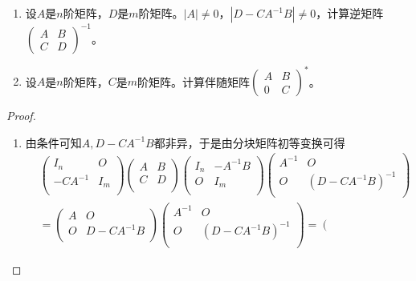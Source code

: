 \documentclass[../../main.tex]{subfiles}
\begin{document}
\begin{example}
\begin{enumerate}
\item 设\(A\)是\(n\)阶矩阵，\(D\)是\(m\)阶矩阵。\(|A|\neq0\)，\(|D - CA^{-1}B|\neq0\)，计算逆矩阵\(\begin{pmatrix}A & B \\ C & D\end{pmatrix}^{-1}\)。

\item 设\(A\)是\(n\)阶矩阵，\(C\)是\(m\)阶矩阵。计算伴随矩阵\(\begin{pmatrix}A & B \\ 0 & C\end{pmatrix}^*\)。 
\end{enumerate}
\end{example}
\begin{proof}
\begin{enumerate}
\item 由条件可知\(A,D-CA^{-1}B\)都非异，于是由分块矩阵初等变换可得
\begin{align*}
&\left( \begin{matrix}
I_n&O\\
-CA^{-1}&I_m\\
\end{matrix} \right) 
\left( \begin{matrix}
A&B\\
C&D\\
\end{matrix} \right) 
\left( \begin{matrix}
I_n&-A^{-1}B\\
O&I_m\\
\end{matrix} \right) 
\left( \begin{matrix}
A^{-1}&O\\
O&\left( D-CA^{-1}B \right)^{-1}\\
\end{matrix} \right) 
\\
&=
\left( \begin{matrix}
A&O\\
O&D-CA^{-1}B\\
\end{matrix} \right) 
\left( \begin{matrix}
A^{-1}&O\\
O&\left( D-CA^{-1}B \right)^{-1}\\
\end{matrix} \right) 
=
\left( \begin{matrix}

\end{matrix}
\end{align*}
\end{enumerate}
\end{proof}
\end{document}
